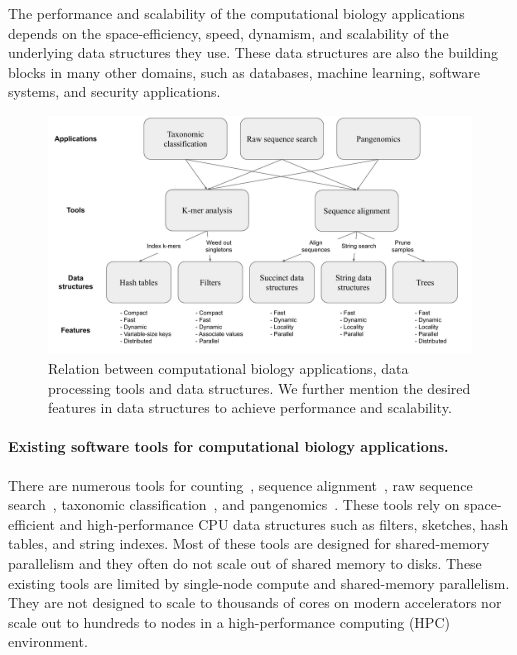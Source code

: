 The performance and scalability of the computational biology applications
depends on the space-efficiency, speed, dynamism, and scalability of the
underlying data structures they use. These data structures are also the building blocks in many other domains, such as databases, machine learning, software systems, and security applications.

\begin{figure}
\centering
\includegraphics[width=1.0\textwidth]{images/PPOSS_App_DS}
\caption{Relation between computational biology applications, data processing tools and data structures. We further mention the desired features in data structures to achieve performance and scalability.}
\label{fig1}
\end{figure}


\paragraph{Existing software tools for computational biology applications.}

There are numerous tools for \kmer counting~\cite{MarccaisKi11,PandeyBJP17a}, sequence alignment~\cite{altschul1990basic,kielbasa2011adaptive,li2018minimap2,schwartz2003human}, raw sequence search~\cite{solomon2016fast,PandeyABFJP18Cell}, taxonomic classification~\cite{wood2014kraken,wood2019improved}, and pangenomics~\cite{garrison2018variation,pandey2021variantstore}. These tools rely on space-efficient and high-performance CPU data structures such as filters, sketches, hash tables, and string indexes. Most of these tools are designed for shared-memory parallelism and they often do not scale out of shared memory to disks.
These existing tools are limited by single-node compute and shared-memory parallelism. They are not designed to scale to thousands of cores on modern accelerators nor scale out to hundreds to nodes in a high-performance computing (HPC) environment.
%


